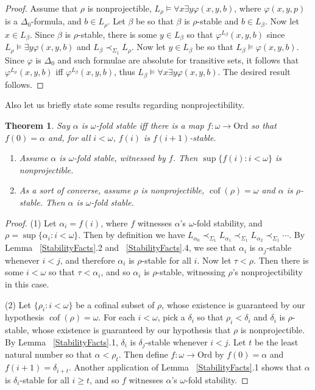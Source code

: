 \documentclass{article}
\newcommand{\Ord}{\mathrm{Ord}}
\theoremstyle{definition}
\theoremstyle{plain}
\newtheorem{theorem}[definition]{Theorem}
\theoremstyle{plain}
\theoremstyle{plain}
\theoremstyle{plain}
\theoremstyle{remark}
\theoremstyle{remark}
\theoremstyle{remark}
\theoremstyle{plain}
\theoremstyle{plain}
\theoremstyle{plain}
\begin{document}
\begin{proof}
Assume that $\rho$ is nonprojectible, $L_\rho \models \forall x \exists y \varphi(x,y,b)$, where $\varphi(x,y,p)$ is a $\Delta_0$-formula, and $b \in L_\rho$. Let $\beta$ be so that $\beta$ is $\rho$-stable and $b \in L_\beta$. Now let $x \in L_\beta$. Since $\beta$ is $\rho$-stable, there is some $y \in L_\beta$ so that $\varphi^{L_\beta}(x,y,b)$ since $L_\rho \models \exists y \varphi(x,y,b)$ and $L_\beta \prec_{\Sigma_1} L_\rho$. Now let $y \in L_\beta$ be so that $L_\beta \models \varphi(x,y,b)$. Since $\varphi$ is $\Delta_0$ and such formulae are absolute for transitive sets, it follows that $\varphi^{L_\rho}(x,y,b)$ iff $\varphi^{L_\beta}(x,y,b)$, thus $L_\beta \models \forall x \exists y \varphi(x,y,b)$. The desired result follows.
\end{proof}

Also let us briefly state some results regarding nonprojectibility.

\begin{theorem}
Say $\alpha$ is $\omega$-fold stable iff there is a map $f: \omega \to \Ord$ so that $f(0) = \alpha$ and, for all $i < \omega$, $f(i)$ is $f(i+1)$-stable.

\begin{enumerate}
    \item Assume $\alpha$ is $\omega$-fold stable, witnessed by $f$. Then $\sup\{f(i): i < \omega\}$ is nonprojectible.
    \item As a sort of converse, assume $\rho$ is nonprojectible, $\operatorname{cof}(\rho) = \omega$ and $\alpha$ is $\rho$-stable. Then $\alpha$ is $\omega$-fold stable.
\end{enumerate}
\end{theorem}

\begin{proof}
(1) Let $\alpha_i = f(i)$, where $f$ witnesses $\alpha$'s $\omega$-fold stability, and $\rho = \sup\{\alpha_i: i < \omega\}$. Then by definition we have $L_{\alpha_0} \prec_{\Sigma_1} L_{\alpha_1} \prec_{\Sigma_1} L_{\alpha_2} \prec_{\Sigma_1} \cdots$. By Lemma ~\ref{StabilityFacts}.2 and ~\ref{StabilityFacts}.4, we see that $\alpha_i$ is $\alpha_j$-stable whenever $i < j$, and therefore $\alpha_i$ is $\rho$-stable for all $i$. Now let $\tau < \rho$. Then there is some $i < \omega$ so that $\tau < \alpha_i$, and so $\alpha_i$ is $\rho$-stable, witnessing $\rho$'s nonprojectibility in this case.

(2) Let $\{\rho_i: i < \omega\}$ be a cofinal subset of $\rho$, whose existence is guaranteed by our hypothesis $\operatorname{cof}(\rho) = \omega$. For each $i < \omega$, pick a $\delta_i$ so that $\rho_i < \delta_i$ and $\delta_i$ is $\rho$-stable, whose existence is guaranteed by our hypothesis that $\rho$ is nonprojectible. By Lemma ~\ref{StabilityFacts}.1, $\delta_i$ is $\delta_j$-stable whenever $i < j$. Let $t$ be the least natural number so that $\alpha < \rho_t$. Then define $f: \omega \to \Ord$ by $f(0) = \alpha$ and $f(i+1) = \delta_{i+t}$. Another application of Lemma ~\ref{StabilityFacts}.1 shows that $\alpha$ is $\delta_i$-stable for all $i \geq t$, and so $f$ witnesses $\alpha$'s $\omega$-fold stability.
\end{proof}
\end{document}
